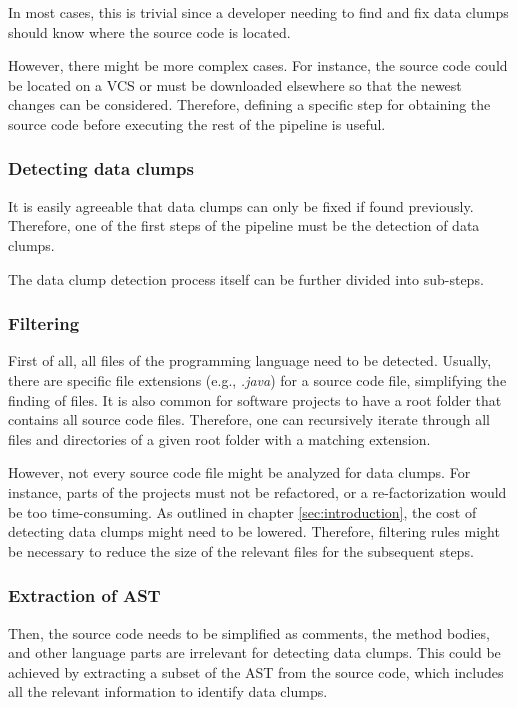 In most cases, this is trivial since a developer needing to find and fix data clumps should know where the source code is located.

However, there might be more complex cases. For instance, the source code could be located on a \ac{VCS} or must be downloaded elsewhere so that the newest changes can be considered. Therefore, defining a specific step for obtaining the source code before executing the rest of the pipeline is useful. 
\subsubsection{Detecting data clumps}\label{subsec:chap3_data_clump_detection}
It is easily agreeable that data clumps can only be fixed if found previously. Therefore, one of the first steps of the pipeline must be the detection of data clumps. 

The data clump detection process itself can be further divided into sub-steps.
\subsubsection{Filtering}\label{subsub:filtering_files}
First of all, all files of the programming language need to be detected. Usually, there are specific file extensions (e.g., \textit{.java}) for a source code file, simplifying the finding of files. It is also common for software projects to have a root folder that contains all source code files. Therefore, one can recursively iterate through all files and directories of a given root folder with a matching extension. 

However, not every source code file might be analyzed for data clumps. For instance, parts of the projects must not be refactored, or a re-factorization would be too time-consuming. As outlined in chapter \ref{sec:introduction}, the cost of detecting data clumps might need to be lowered. Therefore, filtering rules might be necessary to reduce the size of the relevant files for the subsequent steps.  

\subsubsection{Extraction of AST}
Then,  the source code needs to be simplified as comments, the method bodies, and other language parts are irrelevant for detecting data clumps. This could be achieved by extracting a subset of the \ac{AST} from the source code, which includes all the relevant information to identify data clumps.
